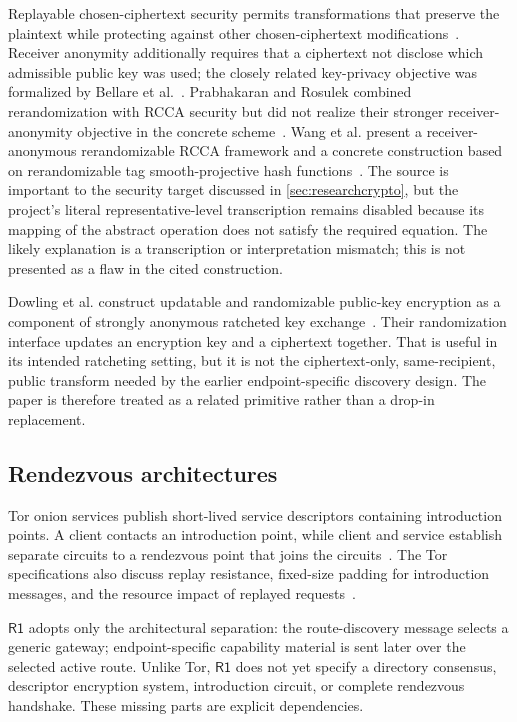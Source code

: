 \documentclass[11pt,oneside]{article}
\newcommand{\Rone}{\ensuremath{\mathsf{R1}}}
\begin{document}
Replayable chosen-ciphertext security permits transformations that preserve the plaintext while protecting against other chosen-ciphertext modifications~\cite{rcca2003}. Receiver anonymity additionally requires that a ciphertext not disclose which admissible public key was used; the closely related key-privacy objective was formalized by Bellare et al.~\cite{keyprivacy2001}. Prabhakaran and Rosulek combined rerandomization with RCCA security but did not realize their stronger receiver-anonymity objective in the concrete scheme~\cite{rcca2007}. Wang et al. present a receiver-anonymous rerandomizable RCCA framework and a concrete construction based on rerandomizable tag smooth-projective hash functions~\cite{anonrcca2021}. The source is important to the security target discussed in \cref{sec:researchcrypto}, but the project's literal representative-level transcription remains disabled because its mapping of the abstract operation does not satisfy the required equation. The likely explanation is a transcription or interpretation mismatch; this is not presented as a flaw in the cited construction.

Dowling et al. construct updatable and randomizable public-key encryption as a component of strongly anonymous ratcheted key exchange~\cite{urpke2022}. Their randomization interface updates an encryption key and a ciphertext together. That is useful in its intended ratcheting setting, but it is not the ciphertext-only, same-recipient, public transform needed by the earlier endpoint-specific discovery design. The paper is therefore treated as a related primitive rather than a drop-in replacement.

\subsection{Rendezvous architectures}

Tor onion services publish short-lived service descriptors containing introduction points. A client contacts an introduction point, while client and service establish separate circuits to a rendezvous point that joins the circuits~\cite{toroverview,torrendezvous,torintro}. The Tor specifications also discuss replay resistance, fixed-size padding for introduction messages, and the resource impact of replayed requests~\cite{torintro}.

\Rone{} adopts only the architectural separation: the route-discovery message selects a generic gateway; endpoint-specific capability material is sent later over the selected active route. Unlike Tor, \Rone{} does not yet specify a directory consensus, descriptor encryption system, introduction circuit, or complete rendezvous handshake. These missing parts are explicit dependencies.
\end{document}
